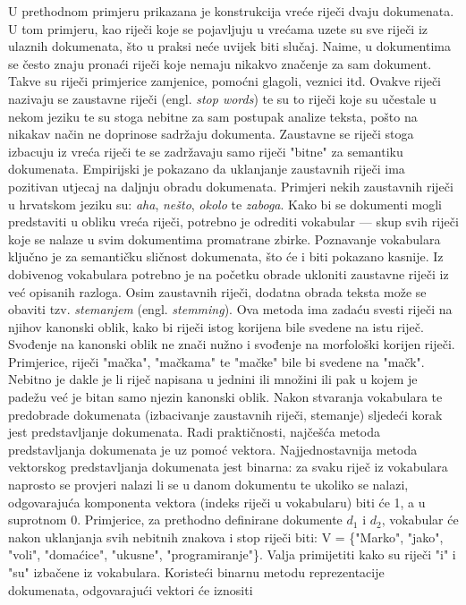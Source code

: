 \documentclass[times, utf8, zavrsni]{fer}
\begin{document}
U prethodnom primjeru prikazana je konstrukcija vreće riječi dvaju dokumenata. U tom primjeru, kao riječi koje se pojavljuju u vrećama uzete su sve riječi iz ulaznih dokumenata, što u praksi neće uvijek biti slučaj. Naime, u dokumentima se često znaju pronaći riječi koje nemaju nikakvo značenje za sam dokument. Takve su riječi primjerice zamjenice, pomoćni glagoli, veznici itd. Ovakve riječi nazivaju se zaustavne riječi (engl. \textit{stop words}) te su to riječi koje su učestale u nekom jeziku te su stoga nebitne za sam postupak analize teksta, pošto na nikakav način ne doprinose sadržaju dokumenta. Zaustavne se riječi stoga izbacuju iz vreća riječi te se zadržavaju samo riječi "bitne" za semantiku dokumenata. Empirijski je pokazano da uklanjanje zaustavnih riječi ima pozitivan utjecaj na daljnju obradu dokumenata. Primjeri nekih zaustavnih riječi u hrvatskom jeziku su: \textit{aha}, \textit{nešto}, \textit{okolo} te \textit{zaboga}.
Kako bi se dokumenti mogli predstaviti u obliku vreća riječi, potrebno je odrediti vokabular — skup svih riječi koje se nalaze u svim dokumentima promatrane zbirke. Poznavanje vokabulara ključno je za semantičku sličnost dokumenata, što će i biti pokazano kasnije. Iz dobivenog vokabulara potrebno je na početku obrade ukloniti zaustavne riječi iz već opisanih razloga. Osim zaustavnih riječi, dodatna obrada teksta može se obaviti tzv. \textit{stemanjem} (engl. \textit{stemming}). Ova metoda ima zadaću svesti riječi na njihov kanonski oblik, kako bi riječi istog korijena bile svedene na istu riječ. Svođenje na kanonski oblik ne znači nužno i svođenje na morfološki korijen riječi. Primjerice, riječi "mačka", "mačkama" te "mačke" bile bi svedene na "mačk". Nebitno je dakle je li riječ napisana u jednini ili množini ili pak u kojem je padežu već je bitan samo njezin kanonski oblik.
Nakon stvaranja vokabulara te predobrade dokumenata (izbacivanje zaustavnih riječi, stemanje) sljedeći korak jest predstavljanje dokumenata. Radi praktičnosti, najčešća metoda predstavljanja dokumenata je uz pomoć vektora.
Najjednostavnija metoda vektorskog predstavljanja dokumenata jest binarna: za svaku riječ iz vokabulara naprosto se provjeri nalazi li se u danom dokumentu te ukoliko se nalazi, odgovarajuća komponenta vektora (indeks riječi u vokabularu) biti će 1, a u suprotnom 0. Primjerice, za prethodno definirane dokumente $d_{1}$ i $d_{2}$, vokabular će nakon uklanjanja svih nebitnih znakova i stop riječi biti: V = \{"Marko", "jako", "voli", "domaćice", "ukusne", "programiranje"\}. Valja primijetiti kako su riječi "i" i "su" izbačene iz vokabulara. Koristeći binarnu metodu reprezentacije dokumenata, odgovarajući vektori će iznositi
\end{document}
